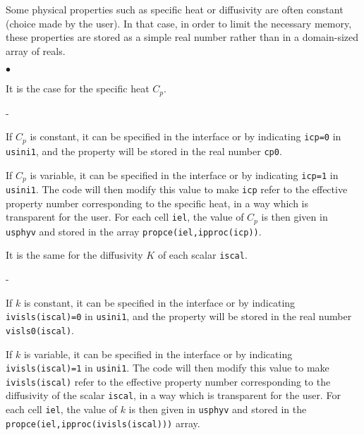 {{{\label{provar}
Some physical properties such as specific heat or diffusivity are often
constant (choice made by the user).
In that case, in order to limit the necessary memory, these
properties are stored as a simple real number rather than in a domain-sized
array of reals.
\begin{list}{$\bullet$}{}
\item It is the case for the specific heat $C_p$.
\begin{list}{-}{}
\item If $C_p$ is constant, it can be specified in
      the interface or by indicating \texttt{icp=0} in \texttt{usini1},
      and the property will be stored in the real number \texttt{cp0}.
\item If $C_p$ is variable, it can be specified in the interface or by
      indicating \texttt{icp=1} in \texttt{usini1}. The code will then
      modify this value to make \texttt{icp} refer to the effective
      property number corresponding to the specific heat,
      in a way which is transparent for the user. For each cell
      \texttt{iel}, the value of $C_p$ is then given in \texttt{usphyv} and
      stored in the array \texttt{propce(iel,ipproc(icp))}.
\end{list}
\item It is the same for the diffusivity $K$ of each scalar \texttt{iscal}.
\begin{list}{-}{}
\item If $k$ is constant, it can be specified in the interface or by
      indicating \texttt{ivisls(iscal)=0} in \texttt{usini1}, and the property
      will be stored in the real number \texttt{visls0(iscal)}.
\item If $k$ is variable, it can be specified in the interface or by
      indicating \texttt{ivisls(iscal)=1} in \texttt{usini1}. The code will then
      modify this value to make \texttt{ivisls(iscal)} refer to the effective
      property number corresponding to the diffusivity of the scalar
      \texttt{iscal}, in a way which is transparent for the user. For each cell
      \texttt{iel}, the value of $k$ is then given in \texttt{usphyv} and stored
      in the \texttt{propce(iel,ipproc(ivisls(iscal)))} array.
\end{list}
\end{list}

}}}
